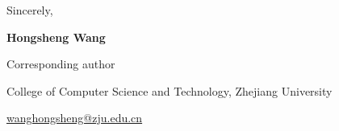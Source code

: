 \documentclass[10pt,a4paper]{article}
\begin{document}
Sincerely,\par
\textbf{Hongsheng Wang}\par
Corresponding author\par
College of Computer Science and Technology, Zhejiang University\par
\href{mailto:wanghongsheng@zju.edu.cn}{wanghongsheng@zju.edu.cn}
\end{document}
